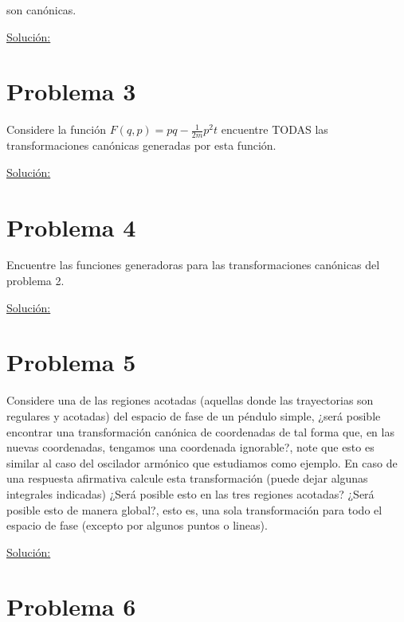 \documentclass[a4paper,10pt]{article}
\numberwithin{equation}{section}
\begin{document}
son canónicas.

\vspace{.3cm}

\underline{Solución:} \vspace{.3cm}

\section{Problema 3}

Considere la función $F(q,p) = pq - \frac{1}{2m}p^2 t$ encuentre TODAS las transformaciones 
canónicas generadas por esta función.

\vspace{.3cm}

\underline{Solución:} \vspace{.3cm}

\section{Problema 4}

Encuentre las funciones generadoras para las transformaciones canónicas del problema 
2.

\vspace{.3cm}

\underline{Solución:} \vspace{.3cm}

\section{Problema 5}

Considere una de las regiones acotadas (aquellas donde las trayectorias son regulares 
y acotadas) del espacio de fase de un péndulo simple, ¿será posible encontrar una 
transformación canónica de coordenadas de tal forma que, en las nuevas coordenadas, 
tengamos una coordenada ignorable?, note que esto es similar al caso del oscilador 
armónico que estudiamos como ejemplo. En caso de una respuesta afirmativa calcule 
esta transformación (puede dejar algunas integrales indicadas) ¿Será posible 
esto en las tres regiones acotadas? ¿Será posible esto de manera global?, esto es,
una sola transformación para todo el espacio de fase (excepto por algunos puntos o 
lineas).

\vspace{.3cm}

\underline{Solución:} \vspace{.3cm}

\section{Problema 6}
\end{document}
